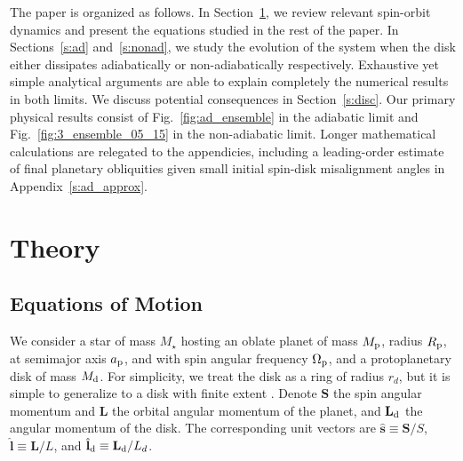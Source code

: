 \documentclass[
        fleqn,
        usenatbib,
    ]{mnras}
\newcommand*{\bm}[1]{\boldsymbol{\mathbf{#1}}}
\newcommand*{\uv}[1]{\hat{\bm{#1}}}
\begin{document}
The paper is organized as follows. In Section~\ref{s:eq}, we review relevant
spin-orbit dynamics and present the equations studied in the rest of the paper.
In Sections~\ref{s:ad} and~\ref{s:nonad}, we study the evolution of the system
when the disk either dissipates adiabatically or non-adiabatically respectively.
Exhaustive yet simple analytical arguments are able to explain completely the
numerical results in both limits. We discuss potential consequences in
Section~\ref{s:disc}. Our primary physical results consist of
Fig.~\ref{fig:ad_ensemble} in the adiabatic limit and
Fig.~\ref{fig:3_ensemble_05_15} in the non-adiabatic limit. Longer mathematical
calculations are relegated to the appendicies, including a leading-order
estimate of final planetary obliquities given small initial spin-disk
misalignment angles in Appendix~\ref{s:ad_approx}.

\section{Theory}\label{s:eq}

\subsection{Equations of Motion}

We consider a star of mass $M_\star$ hosting an oblate planet of mass $M_{\rm
p}$, radius $R_{\rm p}$, at semimajor axis $a_{\rm p}$, and with spin angular
frequency $\Omega_{\rm p}$, and a protoplanetary disk of mass $M_{\rm d}$. For
simplicity, we treat the disk as a ring of radius $r_d$, but it is simple to
generalize to a disk with finite extent \citep[see][]{millholland_disk}.
Denote $\bm{S}$ the spin angular momentum and $\bm{L}$ the orbital angular
momentum of the planet, and $\bm{L}_{\rm d}$ the angular momentum of the disk.
The corresponding unit vectors are $\uv{s} \equiv \bm{S} / S$,
$\uv{l} \equiv \bm{L} / L$, and $\uv{l}_{\rm d} \equiv \bm{L}_{\rm
d} / L_d$.
\end{document}
